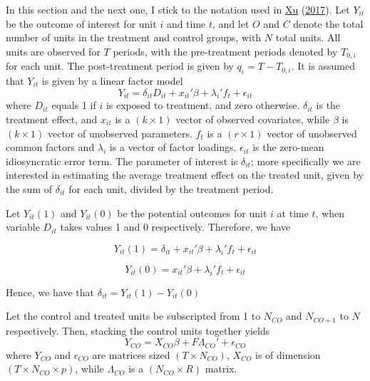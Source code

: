 \documentclass[12pt,nobind, a4paper]{reedthesis}
\begin{document}
 In this section and the next one, I stick to the notation used in \protect\hyperlink{ref-xu_generalized_2017}{Xu} (\protect\hyperlink{ref-xu_generalized_2017}{2017}). Let \(Y_{it}\) be the outcome of interest for unit \(i\) and time \(t\), and let \(O\) and \(C\) denote the total number of units in the treatment and control groups, with \(N\) total units. All units are observed for \(T\) periods, with the pre-treatment periods denoted by \(T_{0, i}\) for each unit. The post-treatment period is given by \(q_{i}=T-T_{0,i}\). It is assumed that \(Y_{it}\) is given by a linear factor model
 \begin{equation}
 Y_{it}=\delta_{it} D_{it}+ x_{it}'\beta+ \lambda_{i}'f_{t}+\epsilon_{it}
 \end{equation}
 where \(D_{it}\) equals 1 if \(i\) is exposed to treatment, and zero otherwise. \(\delta_{it}\) is the treatment effect, and \(x_{it}\) is a \((k \times 1)\) vector of observed covariates, while \(\beta\) is \((k \times 1)\) vector of unobserved parameters. \(f_{t}\) is a \((r \times 1)\) vector of unobserved common factors and \(\lambda_{i}\) is a vector of factor loadings. \(\epsilon_{it}\) is the zero-mean idiosyncratic error term. The parameter of interest is \(\delta_{it}\); more specifically we are interested in estimating the average treatment effect on the treated unit, given by the sum of \(\delta_{it}\) for each unit, divided by the treatment period.
 \linebreak

 Let \(Y_{it}(1)\) and \(Y_{it}(0)\) be the potential outcomes for unit \(i\) at time \(t\), when variable \(D_{it}\) takes values 1 and 0 respectively. Therefore, we have

 \[Y_{it}(1)=\delta_{it}+ x_{it}'\beta+ \lambda_{i}'f_{t}+\epsilon_{it}\]

 \[Y_{it}(0)=x_{it}'\beta + \lambda_{i}'f_{t}+\epsilon_{it}\]

 Hence, we have that \(\delta_{it}= Y_{it}(1)-Y_{it}(0)\)

 Let the control and treated units be subscripted from 1 to \(N_{CO}\) and \(N_{CO+1}\) to \(N\) respectively. Then, stacking the control units together yields
 \begin{equation}
 Y_{CO}=X_{CO} \beta+ F \Lambda_{CO}'+\epsilon_{CO}
 \end{equation}
 where \(Y_{CO}\) and \(\epsilon_{CO}\) are matrices sized \((T \times N_{CO})\), \(X_{CO}\) is of dimension \((T \times N_{CO} \times p)\), while \(\Lambda_{CO}\) is a \((N_{CO} \times R)\) matrix.
\end{document}
